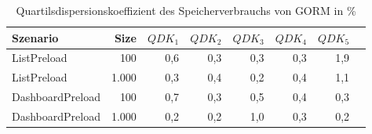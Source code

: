 
\begin{table}[ht]
\setlength{\extrarowheight}{-1pt}
\centering
\caption{Quartilsdispersionskoeffizient des Speicherverbrauchs von GORM in \%}
\begin{tabular}{lrrrrrrr}
\toprule
Szenario & Size & ${QDK_1}$ & ${QDK_2}$ & ${QDK_3}$& ${QDK_4}$ & ${QDK_5}$ \\
\midrule
	ListPreload & 100 & \cellcolor{red!1}  0,6 & \cellcolor{red!1}  0,3 & \cellcolor{red!1}  0,3 & \cellcolor{red!1}  0,3 & \cellcolor{red!2}  1,9 \\
	ListPreload & 1.000 & \cellcolor{red!1}  0,3 & \cellcolor{red!1}  0,4 & \cellcolor{red!1}  0,2 & \cellcolor{red!1}  0,4 & \cellcolor{red!2}  1,1 \\
	DashboardPreload & 100 & \cellcolor{red!1}  0,7 & \cellcolor{red!1}  0,3 & \cellcolor{red!1}  0,5 & \cellcolor{red!1}  0,4 & \cellcolor{red!1}  0,3 \\
	DashboardPreload & 1.000 & \cellcolor{red!1}  0,2 & \cellcolor{red!1}  0,2 & \cellcolor{red!2}  1,0 & \cellcolor{red!1}  0,3 & \cellcolor{red!1}  0,2 \\
\bottomrule
\end{tabular}
\label{tab:quartilsdispersionskoeffizient_speicherverbrauch_gorm}
\end{table}
	